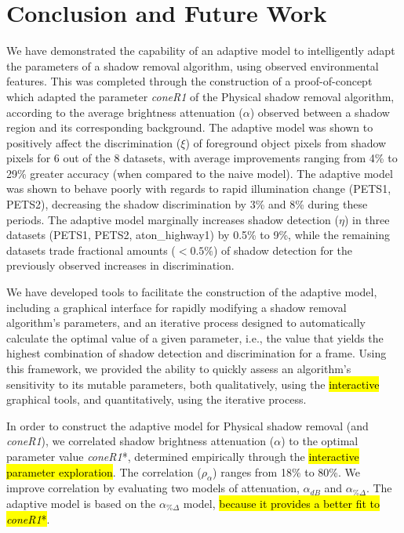 \clearpage
\chapter{Conclusion and Future Work}

We have demonstrated the capability of an adaptive model to intelligently adapt the parameters of a shadow removal algorithm, using observed environmental features. This was completed through the construction of a proof-of-concept which adapted the parameter \textit{coneR1} of the Physical shadow removal algorithm, according to the average brightness attenuation ($\alpha$) observed between a shadow region and its corresponding background. The adaptive model was shown to positively affect the discrimination ($\xi$) of foreground object pixels from shadow pixels for 6 out of the 8 datasets, with average improvements ranging from 4\% to 29\% greater accuracy (when compared to the naive model). The adaptive model was shown to behave poorly with regards to rapid illumination change (PETS1, PETS2), decreasing the shadow discrimination by 3\% and 8\% during these periods. The adaptive model marginally increases shadow detection ($\eta$) in three datasets (PETS1, PETS2, aton\_highway1) by 0.5\% to 9\%, while the remaining datasets trade fractional amounts ($< 0.5\%$) of shadow detection for the previously observed increases in discrimination.

We have developed tools to facilitate the construction of the adaptive model, including a graphical interface for rapidly modifying a shadow removal algorithm's parameters, and an iterative process designed to automatically calculate the optimal value of a given parameter, i.e., the value that yields the highest combination of shadow detection and discrimination for a frame. Using this framework, we provided the ability to quickly assess an algorithm's sensitivity to its mutable parameters, both qualitatively, using the \hl{interactive} graphical tools, and quantitatively, using the iterative process.

In order to construct the adaptive model for Physical shadow removal (and \textit{coneR1}), we correlated shadow brightness attenuation ($\alpha$) to the optimal parameter value \textit{coneR1}*, determined empirically through the \hl{interactive parameter exploration}. The correlation ($\rho_{\alpha}$) ranges from 18\% to 80\%. We improve correlation by evaluating two models of attenuation, $\alpha_{dB}$ and $\alpha_{\%\Delta}$. The adaptive model is based on the $\alpha_{\%\Delta}$ model, \hl{because it provides a better fit to \textit{coneR1}*}.

